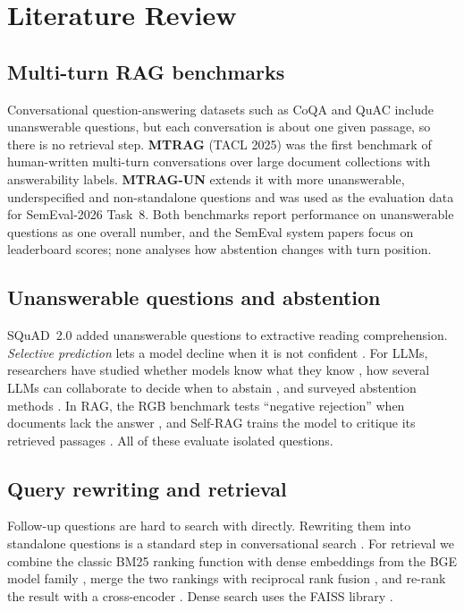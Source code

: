 \documentclass[11pt,a4paper]{report}
\begin{document}
\chapter{Literature Review}

\section{Multi-turn RAG benchmarks}
Conversational question-answering datasets such as CoQA \cite{coqa} and QuAC \cite{quac} include unanswerable questions, but each conversation is about one given passage, so there is no retrieval step. \textbf{MTRAG} \cite{mtrag} (TACL 2025) was the first benchmark of human-written multi-turn conversations over large document collections with answerability labels. \textbf{MTRAG-UN} \cite{mtragun} extends it with more unanswerable, underspecified and non-standalone questions and was used as the evaluation data for SemEval-2026 Task~8. Both benchmarks report performance on unanswerable questions as one overall number, and the SemEval system papers \cite{ails} focus on leaderboard scores; none analyses how abstention changes with turn position.

\section{Unanswerable questions and abstention}
SQuAD~2.0 \cite{squad2} added unanswerable questions to extractive reading comprehension. \emph{Selective prediction} lets a model decline when it is not confident \cite{selective,kamath}. For LLMs, researchers have studied whether models know what they know \cite{kadavath}, how several LLMs can collaborate to decide when to abstain \cite{feng}, and surveyed abstention methods \cite{wen2025}. In RAG, the RGB benchmark tests ``negative rejection'' when documents lack the answer \cite{rgb}, and Self-RAG trains the model to critique its retrieved passages \cite{selfrag}. All of these evaluate isolated questions.

\section{Query rewriting and retrieval}
Follow-up questions are hard to search with directly. Rewriting them into standalone questions is a standard step in conversational search \cite{canard}. For retrieval we combine the classic BM25 ranking function \cite{bm25} with dense embeddings from the BGE model family \cite{bge}, merge the two rankings with reciprocal rank fusion \cite{rrf}, and re-rank the result with a cross-encoder \cite{monobert}. Dense search uses the FAISS library \cite{faiss}.
\end{document}

